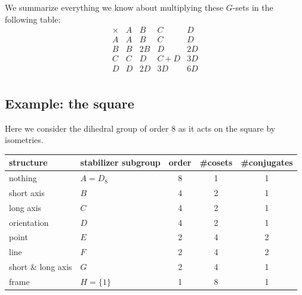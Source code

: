 \documentclass[11pt,oneside]{article}
\newcommand{\thinplus}{\!+\!}
\begin{document}
We summarize everything we know about 
multiplying these $G$-sets in the following table:
{\small
$$
\begin{array}{r|rrrr}
\times & A & B & C & D \\
\hline
A & A & B & C & D \\
B & B & 2B & D & 2D \\
C & C & D & C\thinplus D & 3D \\
D & D & 2D & 3D & 6D \\
\end{array}
$$
}

\subsection{Example: the square}

Here we consider the dihedral group of order 8 as
it acts on the square by isometries.

\begin{samepage}
\begin{center}
\begin{tabular}{ |l|l|c|c|c| }
\hline
structure & stabilizer subgroup & order & \#cosets & \#conjugates \\
\hline
\hline
nothing & $A=D_8$ &       8        &  1      &   1         \\
\hline
short axis& $B$ &       4        &  2      &   1         \\
\hline
long axis & $C$ &       4        &  2      &   1         \\
\hline
orientation & $D$ &       4        &  2      &   1         \\
\hline
point & $E$ &       2        &  4      &   2         \\
\hline
line  & $F$ &       2        &  4      &   2         \\
\hline
short \& long axis & $G$ &       2        &  4      &   1         \\
\hline
frame & $H=\{1\} $ &       1        &  8      &   1         \\
\hline
\end{tabular}
\end{center}
\end{samepage}
\end{document}

